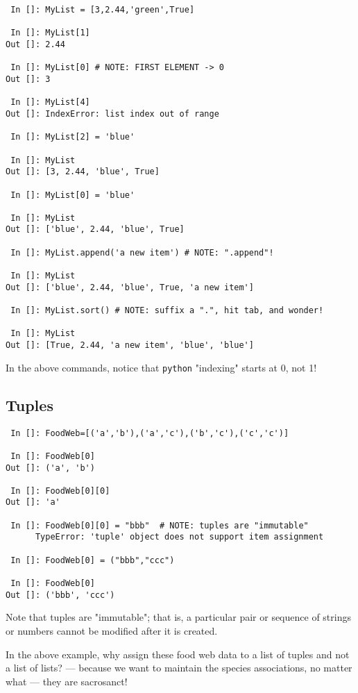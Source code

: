 \begin{lstlisting} 
 In []: MyList = [3,2.44,'green',True]

 In []: MyList[1]
Out []: 2.44

 In []: MyList[0] # NOTE: FIRST ELEMENT -> 0
Out []: 3

 In []: MyList[4]
Out []: IndexError: list index out of range

 In []: MyList[2] = 'blue'

 In []: MyList
Out []: [3, 2.44, 'blue', True]

 In []: MyList[0] = 'blue'

 In []: MyList
Out []: ['blue', 2.44, 'blue', True]

 In []: MyList.append('a new item') # NOTE: ".append"!

 In []: MyList
Out []: ['blue', 2.44, 'blue', True, 'a new item']

 In []: MyList.sort() # NOTE: suffix a ".", hit tab, and wonder!

 In []: MyList
Out []: [True, 2.44, 'a new item', 'blue', 'blue']
\end{lstlisting}

In the above commands, notice that {\tt python} "indexing" starts at 0, 
not 1!  

\subsection{Tuples}

\begin{lstlisting} 
 In []: FoodWeb=[('a','b'),('a','c'),('b','c'),('c','c')]

 In []: FoodWeb[0]
Out []: ('a', 'b')

 In []: FoodWeb[0][0]
Out []: 'a'

 In []: FoodWeb[0][0] = "bbb"  # NOTE: tuples are "immutable"
      TypeError: 'tuple' object does not support item assignment

 In []: FoodWeb[0] = ("bbb","ccc")

 In []: FoodWeb[0]
Out []: ('bbb', 'ccc')
\end{lstlisting} 

Note that tuples are "immutable"; that is, a particular pair or 
sequence of strings or numbers cannot be modified after it is created.

In the above example, why assign these food web data to a list of 
tuples and not a list of lists? --- because we want to maintain the 
species associations, no matter what --- they are sacrosanct! 

